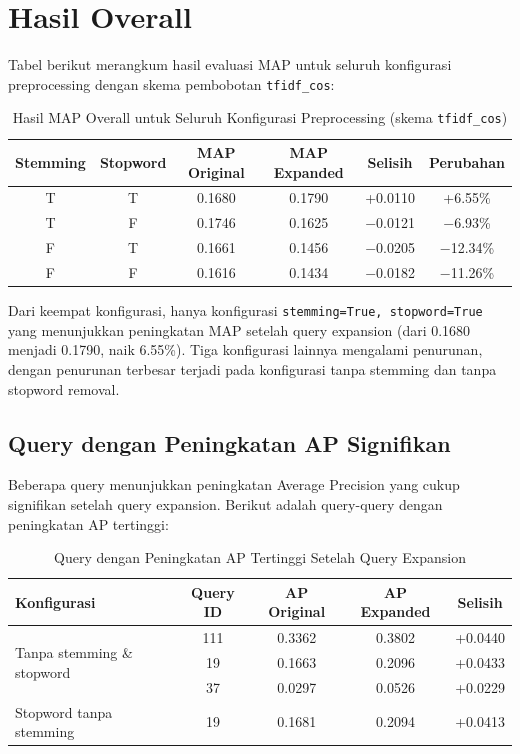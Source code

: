 \documentclass[12pt,a4paper]{report}
\begin{document}
\section{Hasil Overall}

Tabel berikut merangkum hasil evaluasi MAP untuk seluruh konfigurasi preprocessing dengan skema pembobotan \texttt{tfidf\_cos}:

\begin{table}[H]
    \centering
    \small
    \setlength{\tabcolsep}{5pt}
\begin{tabular}{@{}cccccc@{}}
    \toprule
    \textbf{Stemming} & \textbf{Stopword} & \textbf{MAP Original} & \textbf{MAP Expanded} & \textbf{Selisih} & \textbf{Perubahan} \\
    \midrule
    T & T & 0.1680 & 0.1790 & +0.0110 & +6.55\% \\
    T & F & 0.1746 & 0.1625 & $-$0.0121 & $-$6.93\% \\
    F & T & 0.1661 & 0.1456 & $-$0.0205 & $-$12.34\% \\
    F & F & 0.1616 & 0.1434 & $-$0.0182 & $-$11.26\% \\
    \bottomrule
\end{tabular}
\caption{Hasil MAP Overall untuk Seluruh Konfigurasi Preprocessing (skema \texttt{tfidf\_cos})}
\label{tab:map_overall}
\end{table}

Dari keempat konfigurasi, hanya konfigurasi \texttt{stemming=True, stopword=True} yang menunjukkan peningkatan MAP setelah query expansion (dari 0.1680 menjadi 0.1790, naik 6.55\%). Tiga konfigurasi lainnya mengalami penurunan, dengan penurunan terbesar terjadi pada konfigurasi tanpa stemming dan tanpa stopword removal.

\subsection{Query dengan Peningkatan AP Signifikan}

Beberapa query menunjukkan peningkatan Average Precision yang cukup signifikan setelah query expansion. Berikut adalah query-query dengan peningkatan AP tertinggi:

\begin{table}[H]
    \centering
    \begin{tabular}{@{}lcccc@{}}
        \toprule
        \textbf{Konfigurasi} & \textbf{Query ID} & \textbf{AP Original} & \textbf{AP Expanded} & \textbf{Selisih} \\
        \midrule
        \multirow{3}{*}{Tanpa stemming \& stopword} & 111 & 0.3362 & 0.3802 & +0.0440 \\
        & 19  & 0.1663 & 0.2096 & +0.0433 \\
        & 37  & 0.0297 & 0.0526 & +0.0229 \\
        \midrule
        Stopword tanpa stemming & 19  & 0.1681 & 0.2094 & +0.0413 \\
        \bottomrule
    \end{tabular}
    \caption{Query dengan Peningkatan AP Tertinggi Setelah Query Expansion}
    \label{tab:ap_increase}
\end{table}
\end{document}
